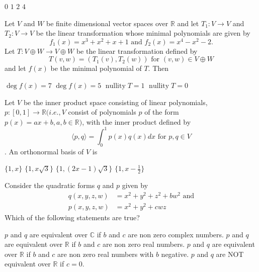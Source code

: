 \documentclass[10pt]{exam}
\DeclareMathOperator{\nullity}{\text{nullity}}
\newcommand{\R}{\ensuremath{\mathbb{R}}}
\begin{document}
\begin{questions}
\begin{oneparchoices}
\choice $0$
\choice $1$
\choice $2$
\choice $4$
\end{oneparchoices}

\question 
Let $V$ and $W$ be finite dimensional vector spaces over $\R$ and let $T_1:V \rightarrow V$ and $T_2:V \rightarrow V$ be the linear transformation whose minimal polynomials are given by 
$$f_1(x)=x^3+x^2+x+1 \text{ and } f_2(x)=x^4-x^2-2.$$
Let $T:V\oplus W \rightarrow V \oplus W$  be the linear transformation defined by 
$$T(v,w)=(T_1(v),T_2(w)) \text{ for } (v,w)\in V\oplus W $$
and let $f(x)$ be the minimal polynomial of $T$. Then

\begin{oneparchoices}
\choice $\deg f(x)=7$
\choice $\deg f(x)=5$
\choice $\nullity T=1$
\choice $\nullity T=0$
\end{oneparchoices}



\question
Let $V$ be the inner product space consisting of linear polynomials, $p:[0,1] \rightarrow \R (i.e., V$ consist of polynomials $p$ of
the form $p(x)=ax+b, a,b \in \R)$, with the inner product defined by
$$\langle p,q \rangle =\int_0^1 p(x)q(x) dx \text{ for } p,q\in V$$.
An orthonormal basis of $V$ is 

\begin{oneparchoices}
\choice $\{1,x\}$
\choice $\{1,x\sqrt{3} \}$
\choice $\{1,(2x-1)\sqrt{3} \}$
\choice $\{1,x-\frac{1}{2} \}$
\end{oneparchoices}

\question
Consider the quadratic forms $q$ and $p$ given by
\begin{align*}
q(x,y,z,w)&=x^2+y^2+z^2+bw^2 \text{ and}\\
p(x,y,z,w)&=x^2+y^2+cwz 
\end{align*}
Which of the following statements are true?

\begin{checkboxes}
\choice $p$ and $q$ are equivalent over $\mathbb{C}$ if $b$ and $c$ are non zero complex numbers.
\choice $p$ and $q$ are equivalent over $\mathbb{R}$ if $b$ and $c$ are non zero real numbers.
\choice $p$ and $q$ are equivalent over $\mathbb{R}$ if $b$ and $c$ are non zero real numbers with $b$ negative.
\choice $p$ and $q$ are NOT equivalent over $\mathbb{R}$ if $c=0$.
\end{checkboxes}



\end{questions}
\end{document}
